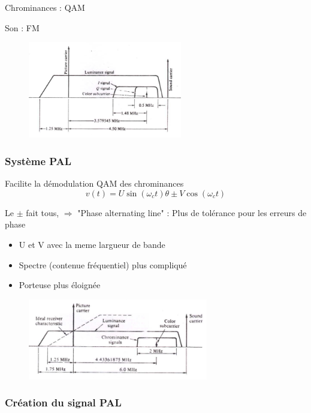 \documentclass[12pt]{article}
\begin{document}
				Chrominances : QAM
				
				Son : FM
				
				\begin{figure}[htp]
				\centering
				\includegraphics[width=0.6\textwidth]{img/NTSC.png}
				\end{figure}
			\subsubsection{Système PAL}
				Facilite la démodulation QAM des chrominances
				\begin{equation}
					v(t) = U\sin (\omega_c t) \theta \pm V \cos (\omega_c t)
				\end{equation}
				
				Le $\pm$ fait tous, $\Rightarrow$ "Phase alternating line" : Plus de tolérance pour les erreurs de phase
				
				\begin{itemize}
					\item U et V avec la meme largueur de bande
					\item Spectre (contenue fréquentiel) plus compliqué
					\item Porteuse plus éloignée
				\end{itemize}
				
				\begin{figure}[htp]
				\centering
				\includegraphics[width=0.7\textwidth]{img/PAL.png}
				\end{figure}
				
			\subsubsection{Création du signal PAL}
			
\end{document}
